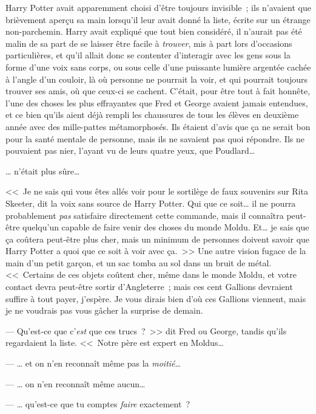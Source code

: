 \later

Harry Potter avait apparemment choisi d'être toujours invisible~; ils n'avaient que brièvement aperçu sa main lorsqu'il leur avait donné la liste, écrite sur un étrange non-parchemin. Harry avait expliqué que tout bien considéré, il n'aurait pas été malin de sa part de se laisser être facile à \emph{trouver}, mis à part lors d'occasions particulières, et qu'il allait donc se contenter d'interagir avec les gens sous la forme d'une voix sans corps, ou sous celle d'une puissante lumière argentée cachée à l'angle d'un couloir, là où personne ne pourrait la voir, et qui pourrait toujours trouver ses amis, où que ceux-ci se cachent. C'était, pour être tout à fait honnête, l'une des choses les plus effrayantes que Fred et George avaient jamais entendues, et ce bien qu'ils aient déjà rempli les chaussures de tous les élèves en deuxième année avec des mille-pattes métamorphosés. Ils étaient d'avis que ça ne serait bon pour la santé mentale de personne, mais ils ne savaient pas quoi répondre. Ils ne pouvaient pas nier, l'ayant vu de leurs quatre yeux, que Poudlard…

… n'était plus sûre…

<<~Je ne sais qui vous êtes allés voir pour le sortilège de faux souvenirs sur Rita Skeeter, dit la voix sans source de Harry Potter. Qui que ce soit… il ne pourra probablement \emph{pas} satisfaire directement cette commande, mais il connaîtra peut-être quelqu'un capable de faire venir des choses du monde Moldu. Et… je sais que ça coûtera peut-être plus cher, mais un minimum de personnes doivent savoir que Harry Potter a quoi que ce soit à voir avec ça.~>> Une autre vision fugace de la main d'un petit garçon, et un sac tomba au sol dans un bruit de métal. <<~Certains de ces objets coûtent cher, même dans le monde Moldu, et votre contact devra peut-être sortir d'Angleterre~; mais ces cent Gallions devraient suffire à tout payer, j'espère. Je vous dirais bien d'où ces Gallions viennent, mais je ne voudrais pas vous gâcher la surprise de demain.

--- Qu'est-ce que c'\emph{est} que ces trucs~?~>> dit Fred ou George, tandis qu'ils regardaient la liste. <<~Notre père est expert en Moldus…

--- … et on n'en reconnaît même pas la \emph{moitié}…

--- … on n'en reconnaît même aucun…

--- … qu'est-ce que tu comptes \emph{faire} exactement~?

